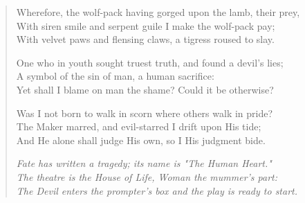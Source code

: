 \begin{verse}
Wherefore, the wolf-pack having gorged upon the lamb, their prey,\\
With siren smile and serpent guile I make the wolf-pack pay;\\
With velvet paws and flensing claws, a tigress roused to slay.

One who in youth sought truest truth, and found a devil's lies;\\
A symbol of the sin of man, a human sacrifice:\\
Yet shall I blame on man the shame? Could it be otherwise?

Was I not born to walk in scorn where others walk in pride?\\
The Maker marred, and evil-starred I drift upon His tide;\\
And He alone shall judge His own, so I His judgment bide.

\textit{
Fate has written a tragedy; its name is "The Human Heart."\\
The theatre is the House of Life, Woman the mummer's part:\\
The Devil enters the prompter's box and the play is ready to start.
}
\end{verse}
